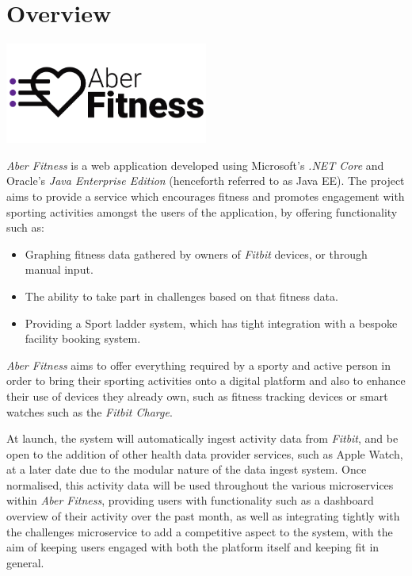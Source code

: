 \chapter{Overview}

\begin{center}
	\includegraphics[width=0.5\textwidth]{Images/aberfitness.png}
\end{center}

\par
\textit{Aber Fitness} is a web application developed using Microsoft's \textit{.NET Core} and Oracle's \textit{Java Enterprise Edition} (henceforth referred to as Java EE). The project aims to provide a service which encourages fitness and promotes engagement with sporting activities amongst the users of the application, by offering functionality such as:

\begin{itemize}
	\item Graphing fitness data gathered by owners of \textit{Fitbit} devices, or through manual input.
	\item The ability to take part in challenges based on that fitness data.
	\item Providing a Sport ladder system, which has tight integration with a bespoke facility booking system.
\end{itemize}

\textit{Aber Fitness} aims to offer everything required by a sporty and active person in order to bring their sporting activities onto a digital platform and also to enhance their use of devices they already own, such as fitness tracking devices or smart watches such as the \textit{Fitbit Charge}.

\par
At launch, the system will automatically ingest activity data from \textit{Fitbit}, and be open to the addition of other health data provider services, such as Apple Watch, at a later date due to the modular nature of the data ingest system. Once normalised, this activity data will be used throughout the various microservices within \textit{Aber Fitness}, providing users with functionality such as a dashboard overview of their activity over the past month, as well as integrating tightly with the challenges microservice to add a competitive aspect to the system, with the aim of keeping users engaged with both the platform itself and keeping fit in general.

